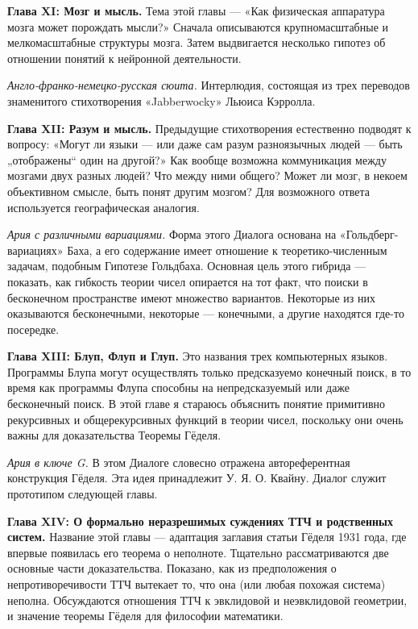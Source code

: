 \textbf{Глава XI: Мозг и мысль.} Тема этой главы --- «Как физическая аппаратура мозга может порождать мысли?» Сначала описываются крупномасштабные и мелкомасштабные структуры мозга. Затем выдвигается несколько гипотез об отношении понятий к нейронной деятельности.

\emph{Англо-франко-немецко-русская сюита.} Интерлюдия, состоящая из трех переводов знаменитого стихотворения «Jabberwocky» Льюиса Кэрролла.

\textbf{Глава XII: Разум и мысль.} Предыдущие стихотворения естественно подводят к вопросу: «Могут ли языки --- или даже сам разум разноязычных людей --- быть „отображены`` один на другой?» Как вообще возможна коммуникация между мозгами двух разных людей? Что между ними общего? Может ли мозг, в некоем объективном смысле, быть понят другим мозгом? Для возможного ответа используется географическая аналогия.

\emph{Ария с различными вариациями.} Форма этого Диалога основана на «Гольдберг-вариациях» Баха, а его содержание имеет отношение к теоретико-численным задачам, подобным Гипотезе Гольдбаха. Основная цель этого гибрида --- показать, как гибкость теории чисел опирается на тот факт, что поиски в бесконечном пространстве имеют множество вариантов. Некоторые из них оказываются бесконечными, некоторые --- конечными, а другие находятся где-то посередке.

\textbf{Глава XIII: Блуп, Флуп и Глуп.} Это названия трех компьютерных языков. Программы Блупа могут осуществлять только предсказуемо конечный поиск, в то время как программы Флупа способны на непредсказуемый или даже бесконечный поиск. В этой главе я стараюсь объяснить понятие примитивно рекурсивных и общерекурсивных функций в теории чисел, поскольку они очень важны для доказательства Теоремы Гёделя.

\emph{Ария в ключе G.} В этом Диалоге словесно отражена автореферентная конструкция Гёделя. Эта идея принадлежит У. Я. О. Квайну. Диалог служит прототипом следующей главы.

\textbf{Глава XIV: О формально неразрешимых суждениях ТТЧ и родственных систем.} Название этой главы --- адаптация заглавия статьи Гёделя 1931 года, где впервые появилась его теорема о неполноте. Тщательно рассматриваются две основные части доказательства. Показано, как из предположения о непротиворечивости ТТЧ вытекает то, что она (или любая похожая система) неполна. Обсуждаются отношения ТТЧ к эвклидовой и неэвклидовой геометрии, и значение теоремы Гёделя для философии математики.

